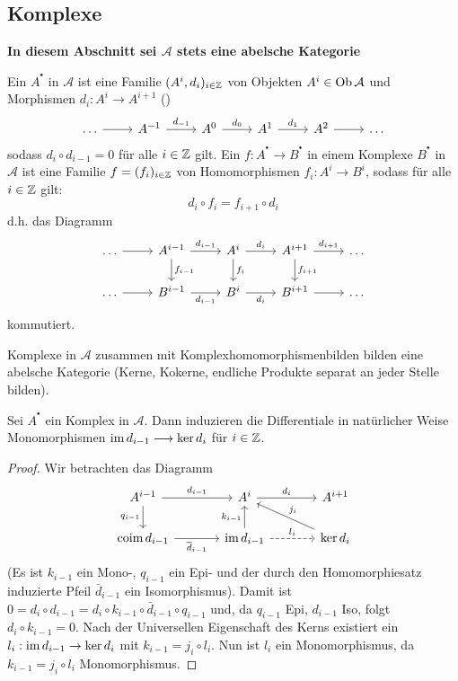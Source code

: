 \subsection{Komplexe}
\begin{center}
	\textbf{In diesem Abschnitt sei $\mathcal{A}$ stets eine abelsche Kategorie}
\end{center}
\begin{df}\label{7.1}
	Ein  $A^{^\bullet}$ in $\mathcal{A}$ ist eine Familie $(A^i, d_i)_{i\in \mathbb{Z}}$ von Objekten $A^i \in \text{Ob}\,\mathcal{A}$ und Morphismen $d_i: A^i \to A^{i+1}$ ()
	$$\begin{tikzcd}
	\ldots \arrow{r} & A^{-1} \arrow{r}{d_{-1}}& A^0 \arrow{r}{d_0} & A^1 \arrow{r}{d_1} & A^2 \arrow{r} & \ldots
	\end{tikzcd}$$
	sodass $d_i \circ d_{i-1} =0$ für alle $i\in \mathbb{Z}$ gilt. Ein   $f:A^{^\bullet} \to B^{^\bullet}$ in einem Komplexe $B^{^\bullet}$ in $\mathcal{A}$ ist eine Familie $f=(f_i)_{i\in \mathbb{Z}}$ von Homomorphismen $f_i : A^i \to B^i$, sodass für alle $i\in \mathbb{Z}$ gilt:
	$$d_i \circ f_i = f_{i+1} \circ d_i$$
	d.h. das Diagramm 
	$$\begin{tikzcd}
	\ldots \arrow{r} & A^{i-1}\arrow{d}{f_{i-1}} \arrow{r}{d_{i-1}}& A^i \arrow{d}{f_i}\arrow{r}{d_i} & A^{i+1} \arrow{d}{f_{i+1}} \arrow{r}{d_{i+1}} & \ldots\\
	\ldots \arrow{r} & B^{i-1} \arrow[swap]{r}{d_{i-1}} & B^i \arrow[swap]{r}{d_i} & B^{i+1} \arrow{r} & \ldots
	\end{tikzcd}$$
	kommutiert.
\end{df}
\begin{anm}
	Komplexe in $\mathcal{A}$ zusammen mit Komplexhomomorphismenbilden bilden eine abelsche Kategorie (Kerne, Kokerne, endliche Produkte separat an jeder Stelle bilden).
\end{anm}
\begin{bem}\label{7.2}
	Sei $A^{^\bullet}$ ein Komplex in $\mathcal{A}$. Dann induzieren die Differentiale in natürlicher Weise Monomorphismen $\operatorname{im} d_{i-1} \longrightarrow \ker d_i$ für $i\in \mathbb{Z}$.
\end{bem}
\begin{proof}
	Wir betrachten das Diagramm
	$$\begin{tikzcd}[column sep = large]
	A^{i-1} \arrow[swap]{d}{q_{i-1}} \arrow{r}{d_{i-1}} & A^i \arrow{r}{d_i} & A^{i+1} \\
	\text{coim} \, d_{i-1} \arrow[swap]{r}{\bar{d}_{i-1}} & \im d_{i-1} \arrow{u}{k_{i-1}}\arrow[dashed]{r}{l_i} & \ker d_i \arrow[swap]{ul}{j_i}
	\end{tikzcd}$$
	(Es ist $k_{i-1}$ ein Mono-, $q_{i-1}$ ein Epi- und der durch den Homomorphiesatz induzierte Pfeil $\bar{d}_{i-1}$ ein Isomorphismus). Damit ist $0= d_i \circ d_{i-1} = d_i \circ k_{i-1} \circ \bar{d}_{i-1} \circ q_{i-1}$ und, da $q_{i-1}$ Epi, $d_{i-1}$ Iso, folgt $d_i \circ k_{i-1} =0$. Nach der Universellen Eigenschaft des Kerns existiert ein $l_i : \operatorname{im} d_{i-1} \to \ker d_i$ mit $k_{i-1} = j_i \circ l_i$. Nun ist $l_i$ ein Monomorphismus, da $k_{i-1} = j_i \circ l_i$ Monomorphismus.
\end{proof}
